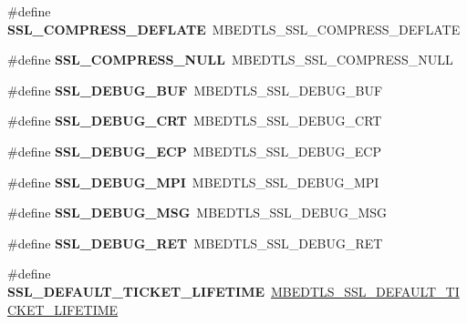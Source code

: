 \begin{DoxyCompactItemize}
\#define {\bfseries S\+S\+L\+\_\+\+C\+O\+M\+P\+R\+E\+S\+S\+\_\+\+D\+E\+F\+L\+A\+TE}~M\+B\+E\+D\+T\+L\+S\+\_\+\+S\+S\+L\+\_\+\+C\+O\+M\+P\+R\+E\+S\+S\+\_\+\+D\+E\+F\+L\+A\+TE
\item 
\mbox{\label{compat-1_83_8h_ad47aca4f7ebf39713fa96eac86343e7b}} 
\#define {\bfseries S\+S\+L\+\_\+\+C\+O\+M\+P\+R\+E\+S\+S\+\_\+\+N\+U\+LL}~M\+B\+E\+D\+T\+L\+S\+\_\+\+S\+S\+L\+\_\+\+C\+O\+M\+P\+R\+E\+S\+S\+\_\+\+N\+U\+LL
\item 
\mbox{\label{compat-1_83_8h_a12c0a73bb030477fea1d39a27302d2fd}} 
\#define {\bfseries S\+S\+L\+\_\+\+D\+E\+B\+U\+G\+\_\+\+B\+UF}~M\+B\+E\+D\+T\+L\+S\+\_\+\+S\+S\+L\+\_\+\+D\+E\+B\+U\+G\+\_\+\+B\+UF
\item 
\mbox{\label{compat-1_83_8h_ae8bf0859b2b43edae44dcb86dfb7946c}} 
\#define {\bfseries S\+S\+L\+\_\+\+D\+E\+B\+U\+G\+\_\+\+C\+RT}~M\+B\+E\+D\+T\+L\+S\+\_\+\+S\+S\+L\+\_\+\+D\+E\+B\+U\+G\+\_\+\+C\+RT
\item 
\mbox{\label{compat-1_83_8h_a890805629163e2cb9aedce4fb8b97b0f}} 
\#define {\bfseries S\+S\+L\+\_\+\+D\+E\+B\+U\+G\+\_\+\+E\+CP}~M\+B\+E\+D\+T\+L\+S\+\_\+\+S\+S\+L\+\_\+\+D\+E\+B\+U\+G\+\_\+\+E\+CP
\item 
\mbox{\label{compat-1_83_8h_a40f09e52dbc1669cb6d9aa438a8641b4}} 
\#define {\bfseries S\+S\+L\+\_\+\+D\+E\+B\+U\+G\+\_\+\+M\+PI}~M\+B\+E\+D\+T\+L\+S\+\_\+\+S\+S\+L\+\_\+\+D\+E\+B\+U\+G\+\_\+\+M\+PI
\item 
\mbox{\label{compat-1_83_8h_adc8ec84d1f22667af3102bf617b8ba03}} 
\#define {\bfseries S\+S\+L\+\_\+\+D\+E\+B\+U\+G\+\_\+\+M\+SG}~M\+B\+E\+D\+T\+L\+S\+\_\+\+S\+S\+L\+\_\+\+D\+E\+B\+U\+G\+\_\+\+M\+SG
\item 
\mbox{\label{compat-1_83_8h_aa48b7ffdea27ae7d7415f86f2dd275fe}} 
\#define {\bfseries S\+S\+L\+\_\+\+D\+E\+B\+U\+G\+\_\+\+R\+ET}~M\+B\+E\+D\+T\+L\+S\+\_\+\+S\+S\+L\+\_\+\+D\+E\+B\+U\+G\+\_\+\+R\+ET
\item 
\mbox{\label{compat-1_83_8h_a8b362b1b53efb0ad81e3183c383c9394}} 
\#define {\bfseries S\+S\+L\+\_\+\+D\+E\+F\+A\+U\+L\+T\+\_\+\+T\+I\+C\+K\+E\+T\+\_\+\+L\+I\+F\+E\+T\+I\+ME}~\mbox{\hyperlink{ssl_8h_a893bf99106ecae0f9d9c0de2b02da6aa}{M\+B\+E\+D\+T\+L\+S\+\_\+\+S\+S\+L\+\_\+\+D\+E\+F\+A\+U\+L\+T\+\_\+\+T\+I\+C\+K\+E\+T\+\_\+\+L\+I\+F\+E\+T\+I\+ME}}

\end{DoxyCompactItemize}
